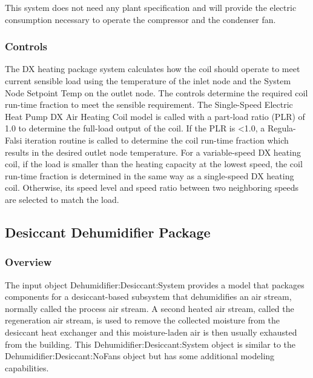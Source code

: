 This system does not need any plant specification and will provide the electric consumption necessary to operate the compressor and the condenser fan.

\subsubsection{Controls}\label{controls-2}

The DX heating package system calculates how the coil should operate to meet current sensible load using the temperature of the inlet node and the System Node Setpoint Temp on the outlet node. The controls determine the required coil run-time fraction to meet the sensible requirement. The Single-Speed Electric Heat Pump DX Air Heating Coil model is called with a part-load ratio (PLR) of 1.0 to determine the full-load output of the coil. If the PLR is \textless{}1.0, a Regula-Falsi iteration routine is called to determine the coil run-time fraction which results in the desired outlet node temperature. For a variable-speed DX heating coil, if the load is smaller than the heating capacity at the lowest speed, the coil run-time fraction is determined in the same way as a single-speed DX heating coil. Otherwise, its speed level and speed ratio between two neighboring speeds are selected to match the load.

\subsection{Desiccant Dehumidifier Package}\label{desiccant-dehumidifier-package}

\subsubsection{Overview}\label{overview-7}

The input object Dehumidifier:Desiccant:System provides a model that packages components for a desiccant-based subsystem that dehumidifies an air stream, normally called the process air stream. A second heated air stream, called the regeneration air stream, is used to remove the collected moisture from the desiccant heat exchanger and this moisture-laden air is then usually exhausted from the building. This Dehumidifier:Desiccant:System object is similar to the Dehumidifier:Desiccant:NoFans object but has some additional modeling capabilities.

